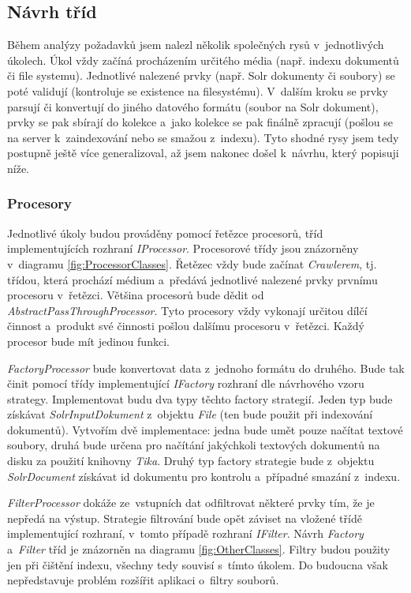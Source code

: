 \subsection{Návrh tříd}
Během analýzy požadavků jsem nalezl několik společných rysů v~jednotlivých úkolech. Úkol vždy začíná procházením určitého média (např. indexu dokumentů či file systemu). Jednotlivé nalezené prvky (např. Solr dokumenty či soubory) se poté validují (kontroluje se existence na filesystému). V~dalším kroku se prvky parsují či konvertují do jiného datového formátu (soubor na Solr dokument), prvky se pak sbírají do kolekce a~jako kolekce se pak finálně zpracují (pošlou se na server k~zaindexování nebo se smažou z~indexu). Tyto shodné rysy jsem tedy postupně ještě více generalizoval, až jsem nakonec došel k~návrhu, který popisuji níže.

\subsubsection{Procesory}
Jednotlivé úkoly budou prováděny pomocí řetězce procesorů, tříd implementujících rozhraní \emph{IProcessor}.  Procesorové třídy jsou znázorněny v~diagramu \ref{fig:ProcessorClasses}. Řetězec vždy bude začínat \emph{Crawlerem}, tj. třídou, která prochází médium a~předává jednotlivé nalezené prvky prvnímu procesoru v~řetězci. Většina procesorů bude dědit od \emph{AbstractPassThroughProcessor}. Tyto procesory vždy vykonají určitou dílčí činnost a~produkt své činnosti pošlou dalšímu procesoru v~řetězci. Každý procesor bude mít jedinou funkci.

\emph{FactoryProcessor} bude konvertovat data z~jednoho formátu do druhého. Bude tak činit pomocí třídy implementující \emph{IFactory} rozhraní dle návrhového vzoru strategy. Implementovat budu dva typy těchto factory strategií. Jeden typ bude získávat \emph{SolrInputDokument} z~objektu \emph{File} (ten bude použit při indexování dokumentů). Vytvořím dvě implementace: jedna bude umět pouze načítat textové soubory, druhá bude určena pro načítání jakýchkoli textových dokumentů na disku za použití knihovny \emph{Tika}. Druhý typ factory strategie bude z~objektu \emph{SolrDocument} získávat id dokumentu pro kontrolu a~případné smazání z~indexu.

\emph{FilterProcessor} dokáže ze~vstupních dat odfiltrovat některé prvky tím, že je nepředá na výstup. Strategie filtrování bude opět záviset na vložené třídě implementující rozhraní, v~tomto případě rozhraní \emph{IFilter}. Návrh \emph{Factory} a~\emph{Filter} tříd je znázorněn na diagramu \ref{fig:OtherClasses}. Filtry budou použity jen při čištění indexu, všechny tedy souvisí s~tímto úkolem. Do budoucna však nepředstavuje problém rozšířit aplikaci o~filtry souborů. 

